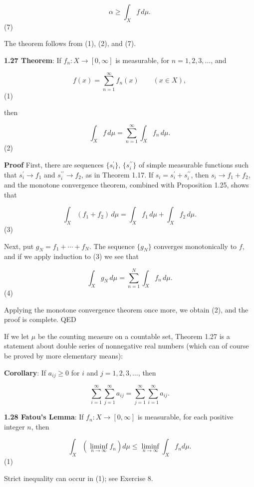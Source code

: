\documentclass[11pt]{article}
\begin{document}
\[
\alpha \geq \int_{X} f \, d\mu.
\](7)

The theorem follows from (1), (2), and (7).

\label{orge863d53}
\textbf{\textbf{1.27 Theorem}}: If \(f_{n} \colon X \to [0, \infty]\) is measurable, for \(n = 1, 2, 3, \ldots\), and

\[
f(x) = \sum\limits_{n=1}^{\infty} f_{n}(x) \qquad (x \in X),
\](1)

then

\[
\int_{X} f \, d\mu = \sum\limits_{n=1}^{\infty} \int_{X} f_{n} \, d\mu.
\](2)

\textbf{\textbf{Proof}} First, there are sequences \(\{s^{\prime}_{i}\}\), \(\{s^{\prime\prime}_{i}\}\) of simple measurable functions such that \(s^{\prime}_{i} \rightarrow f_{1}\) and \(s^{\prime\prime}_{i} \rightarrow f_{2}\), as in Theorem 1.17. If \(s_{i} = s^{\prime}_{i} + s^{\prime\prime}_{i}\), then \(s_{i} \rightarrow f_{1} + f_{2}\), and the monotone convergence theorem, combined with Proposition 1.25, shows that

\[
\int_{X} (f_{1} + f_{2}) \, d\mu = \int_{X} f_{1} \, d\mu + \int_{X} f_{2} \, d\mu.
\](3)

Next, put \(g_{N} = f_{1} + \cdots + f_{N}\). The sequence \(\{g_{N}\}\) converges monotonically to \(f\), and if we apply induction to (3) we see that

\[
\int_{X} g_{N} \, d\mu = \sum\limits_{n=1}^{N} \int_{X} f_{n} \, d\mu.
\](4)

Applying the monotone convergence theorem once more, we obtain (2), and the proof is complete. QED

If we let \(\mu\) be the counting measure on a countable set, Theorem 1.27 is a statement about double series of nonnegative real numbers (which can of course be proved by more elementary means):

\textbf{\textbf{Corollary}}: If \(a_{ij} \geq 0\) for \(i\) and \(j = 1, 2, 3, \ldots\), then

\[
\sum_{i=1}^{\infty} \sum_{j=1}^{\infty} a_{ij} = \sum_{j=1}^{\infty} \sum_{i=1}^{\infty} a_{ij}.
\]

\label{org47a104d}
\textbf{\textbf{1.28 Fatou's Lemma}}: If \(f_{n} \colon X \to [0, \infty]\) is measurable, for each positive integer \(n\), then

\[
\int_{X} \left( \liminf_{n \to \infty} f_{n} \right) d\mu \leq \liminf_{n \to \infty} \int_{X} f_{n} d\mu.
\](1)

Strict inequality can occur in (1); see Exercise 8.
\end{document}
